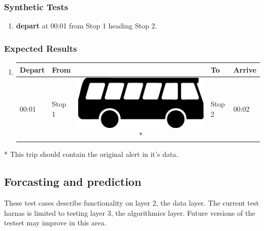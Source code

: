\documentclass[a4paper,11pt]{article}
\newcommand*{\bus}{\includegraphics[scale=0.02]{img/bus}}
\begin{document}
\begin{enumerate}
\begin{figure}[h]
\begin{minipage}{285pt}
\end{minipage}
\label{fig:delay_network}
\vspace{-2em}
\end{figure}

\subsubsection*{Synthetic Tests}
\begin{enumerate}
\item \textbf{depart} at 00:01 from Stop 1 heading Stop 2.
\end{enumerate}

\subsubsection*{Expected Results}
\begin{enumerate}
\item
{\scriptsize
\begin{tabular}{p{.75cm} | p{3.0cm} c p{3.0cm} | p{.75cm} }
\hline
\rowcolor{Gray}
Depart & From & \hspace{0.4cm} & To & Arrive \\
\hline
00:01 & Stop 1 & \bus * & Stop 2 & 00:02 \\
\hline
\end{tabular}
}
\end{enumerate}
* This trip should contain the original alert in it's data.
\newpage


\end{enumerate}



\subsection{Forcasting and prediction}

These test cases describe functionality on layer 2, the data layer. The current test harnas is limited to testing layer 3, the algorithmics layer. Future versions of the testset may improve in this area.
\end{document}
